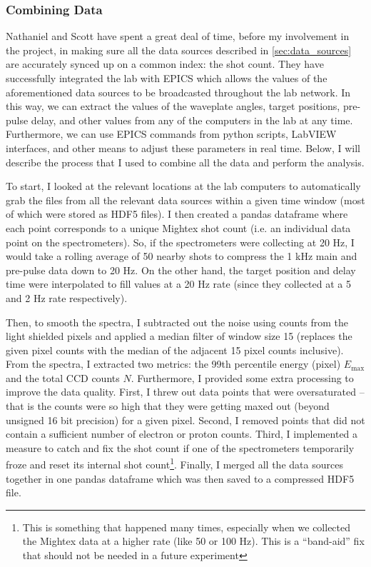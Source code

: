 \subsubsection{Combining Data}

Nathaniel and Scott have spent a great deal of time, before my involvement in the project, in making sure all the data sources described in \autoref{sec:data_sources} are accurately synced up on a common index: the shot count. They have successfully integrated the lab with \gls{EPICS} which allows the values of the aforementioned data sources to be broadcasted throughout the lab network. In this way, we can extract the values of the waveplate angles, target positions, pre-pulse delay, and other values from any of the computers in the lab at any time. Furthermore, we can use \gls{EPICS} commands from python scripts, LabVIEW interfaces, and other means to adjust these parameters in real time. Below, I will describe the process that I used to combine all the data and perform the analysis. 

To start, I looked at the relevant locations at the lab computers to automatically grab the files from all the relevant data sources within a given time window (most of which were stored as \gls{HDF5} files). I then created a pandas dataframe where each point corresponds to a unique Mightex shot count (i.e. an individual data point on the spectrometers). So, if the spectrometers were collecting at 20 Hz, I would take a rolling average of 50 nearby shots to compress the 1 kHz main and pre-pulse data down to 20 Hz. On the other hand, the target position and delay time were interpolated to fill values at a 20 Hz rate (since they collected at a 5 and 2 Hz rate respectively).

Then, to smooth the spectra, I subtracted out the noise using counts from the light shielded pixels and applied a median filter of window size 15 (replaces the given pixel counts with the median of the adjacent 15 pixel counts inclusive). From the spectra, I extracted two metrics: the 99th percentile energy (pixel) $E_\text{max}$ and the total \gls{CCD} counts $N$. Furthermore, I provided some extra processing to improve the data quality. First, I threw out data points that were oversaturated -- that is the counts were so high that they were getting maxed out (beyond unsigned 16 bit precision) for a given pixel. Second, I removed points that did not contain a sufficient number of electron or proton counts. Third, I implemented a measure to catch and fix the shot count if one of the spectrometers temporarily froze and reset its internal shot count\footnote{This is something that happened many times, especially when we collected the Mightex data at a higher rate (like 50 or 100 Hz). This is a ``band-aid'' fix that should not be needed in a future experiment}. Finally, I merged all the data sources together in one pandas dataframe which was then saved to a compressed \gls{HDF5} file.


